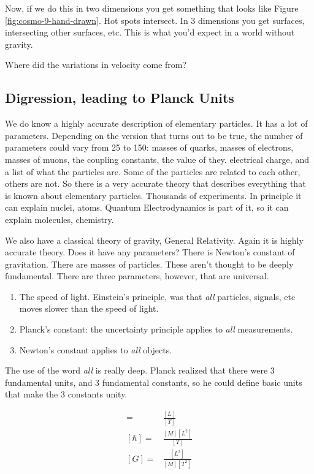 \documentclass[]{article}
\begin{document}
Now, if we do this in two dimensions you get something that looks like Figure \ref{fig:cosmo-9-hand-drawn}. Hot spots intersect. In 3 dimensions you get surfaces, intersecting other surfaces, etc. This is what you'd expect in a world without gravity.

Where did the variations in velocity come from?

\subsection{Digression, leading to Planck Units}
 
We do know a highly accurate description of elementary particles. It has a lot of parameters. Depending on the version that turns out to be true, the number of parameters could vary from 25 to 150: masses of quarks, masses of electrons, masses of muons, the coupling constants, the value of they. electrical charge, and a list of what the particles are. Some of the particles are related to each other, others are not. So there is a very accurate theory that describes everything that is known about elementary particles. Thousands of experiments. In principle it can explain nuclei, atoms. Quantum Electrodynamics is part of it, so it can explain molecules, chemistry.

We also have a classical theory of gravity, General Relativity. Again it is highly accurate theory. Does it have any parameters? There is Newton's constant of gravitation. There are masses of particles. These aren't thought to be deeply fundamental. There are three parameters, however, that are universal.
\begin{enumerate}
	\item The speed of light. Einstein's principle, was that \emph{all} particles, signals, etc moves slower than the speed of light.
	\item Planck's constant: the uncertainty principle applies to \emph{all} measurements.
	\item Newton's constant applies to \emph{all} objects.
\end{enumerate}

The use of the word \emph{all} is really deep. Planck realized that there were 3 fundamental units, and 3 fundamental constants, so he could define basic units that make the 3 constants unity.
 
 \begin{align*}
 	[c] =& \frac{[L]}{[T]}	\\
 	[\hbar]=& \frac{[M][L^2]}{[T]}\\
 	[G]=& \frac{[L^3]}{[M][T^2]} 
 \end{align*}
 
\end{document}
